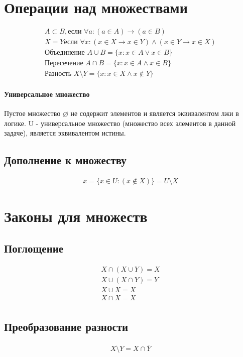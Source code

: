 \documentclass[10pt]{article}
\begin{document}
	\section{Операции над множествами}
		\begin{eqnarray}
			A \subset B, \mbox{если } \forall a : (a \in A) \to (a \in B)\\
			X = Y \mbox{если } \forall x : (x \in X \to x \in Y) \wedge (x \in Y \to x \in X)\\
			\mbox{Объединение } A \cup B = \{x : x \in A \vee x \in B \}\\
			\mbox{Пересечение } A \cap B = \{x : x \in A \wedge x \in B\}\\
			\mbox{Разность } X \setminus Y = \{x : x \in X \wedge x \notin Y\}
		\end{eqnarray}
		\paragraph{Универсальное множество}
		Пустое множество $\varnothing$ не содержит элементов и является эквивалентом лжи в логике.
		\large{U} - универсальное множество (множество всех элементов в данной задаче), является эквивалентом истины.
	
		\subsection{Дополнение к множеству}
			\begin{eqnarray}
				\overline{x} = \{x \in U:(x \notin X)\} = U \setminus X
			\end{eqnarray}
	\section{Законы для множеств}
		\subsection{Поглощение}
			\begin{eqnarray}
				X \cap (X \cup Y) = X\\
				X \cup (X \cap Y) = Y\\
				X \cup X = X\\
				X \cap X = X\\
			\end{eqnarray}
	
	 	\subsection{Преобразование разности}
			\begin{eqnarray}
				X \setminus Y = X \cap \overline{Y}
			\end{eqnarray}
\end{document}
